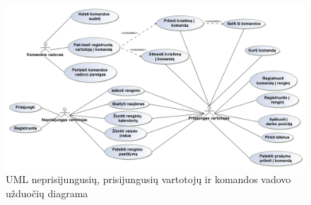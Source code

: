 \documentclass{VUMIFPSkursinis}
\begin{document}
			\begin{figure}[H]
                \centering
                \includegraphics[width=\textwidth]{img/PSI4/Diagrams/UCuser.png}
                \caption{UML neprisijungusių, prisijungusių vartotojų ir komandos vadovo užduočių diagrama}
                \label{fig:uzduociu-diagrama}
            \end{figure}
			
\end{document}
